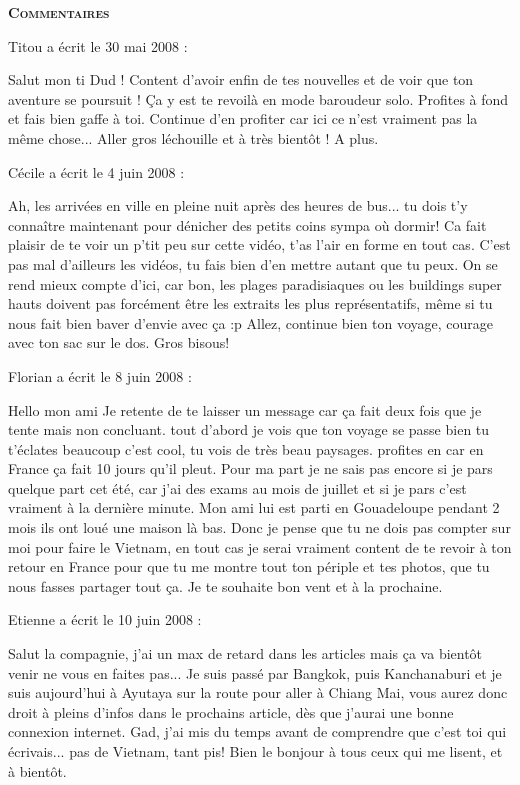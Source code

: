 \bigskip
\textbf{\textsc{Commentaires}}

\medskip
Titou a écrit le 30 mai 2008 :
\begin{displayquote}
Salut mon ti Dud !
Content d'avoir enfin de tes nouvelles et de voir que ton aventure se poursuit ! Ça y est te revoilà en mode baroudeur solo. Profites à fond et fais bien gaffe à toi.
Continue d'en profiter car ici ce n'est vraiment pas la même chose...
Aller gros léchouille et à très bientôt !
A plus.
\end{displayquote}

\medskip
Cécile a écrit le 4 juin 2008 :
\begin{displayquote}
Ah, les arrivées en ville en pleine nuit après des heures de bus... tu dois t'y connaître maintenant pour dénicher des petits coins sympa où dormir!
Ca fait plaisir de te voir un p'tit peu sur cette vidéo, t'as l'air en forme en tout cas. C'est pas mal d'ailleurs les vidéos, tu fais bien d'en mettre autant que tu peux. On se rend mieux compte d'ici, car bon, les plages paradisiaques ou les buildings super hauts doivent pas forcément être les extraits les plus représentatifs, même si tu nous fait bien baver d'envie avec ça :p
Allez, continue bien ton voyage, courage avec ton sac sur le dos.
Gros bisous!
\end{displayquote}

\medskip
Florian a écrit le 8 juin 2008 :
\begin{displayquote}
Hello mon ami
Je retente de te laisser un message car ça fait deux fois que je tente mais non concluant. tout d'abord je vois que ton voyage se passe bien tu t'éclates beaucoup c'est cool, tu vois de très beau paysages. profites en car en France ça fait 10 jours qu'il pleut.
Pour ma part je ne sais pas encore si je pars quelque part cet été, car j'ai des exams au mois de juillet et si je pars c'est vraiment à la dernière minute.
Mon ami lui est parti en Gouadeloupe pendant 2 mois ils ont loué une maison là bas.
Donc je pense que tu ne dois pas compter sur moi pour faire le Vietnam, en tout cas je serai vraiment content de te revoir à ton retour en France pour que tu me montre tout ton périple et tes photos, que tu nous fasses partager tout ça.
Je te souhaite bon vent et à la prochaine.
\end{displayquote}

\medskip
Etienne a écrit le 10 juin 2008 :
\begin{displayquote}
Salut la compagnie, j'ai un max de retard dans les articles mais ça va bientôt venir ne vous en faites pas...
Je suis passé par Bangkok, puis Kanchanaburi et je suis aujourd'hui à Ayutaya sur la route pour aller à Chiang Mai, vous aurez donc droit à pleins d'infos dans le prochains article, dès que j'aurai une bonne connexion internet.
Gad, j'ai mis du temps avant de comprendre que c'est toi qui écrivais... pas de Vietnam, tant pis!
Bien le bonjour à tous ceux qui me lisent, et à bientôt.
\end{displayquote}

